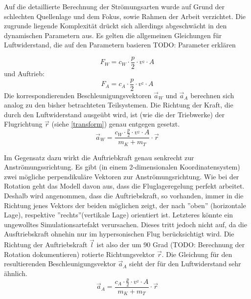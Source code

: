 Auf die detaillierte Berechnung der Strömungsarten wurde auf Grund der schlechten Quellenlage und dem Fokus, sowie Rahmen der Arbeit verzichtet. Die zugrunde liegende Komplexität drückt sich allerdings abgeschwächt in den dynamischen Parametern aus. Es gelten die allgemeinen Gleichungen für Luftwiderstand, die auf den Parametern basieren
TODO: Parameter erklären

$$F_W = c_W \cdot \frac{p}{2} \cdot v^_{2} \cdot A $$
und Auftrieb:
$$F_A = c_A \cdot \frac{p}{2} \cdot v^_{2} \cdot A $$
Die korrespondierenden Beschleunigungsvektoren $\vec a_W$ und $\vec a_A$ berechnen sich analog zu den bisher betrachteten Teilsystemen. Die Richtung der Kraft, die durch den Luftwiderstand ausgeübt wird, ist (wie die der Triebwerke) der Flugrichtung $\vec r$ (siehe \ref{transform}) genau entgegen gesetzt.
$$ \vec a_W = \frac{c_W \cdot \frac{p}{2} \cdot v^_{2} \cdot A}{m_K + m_T} \cdot \vec r $$

Im Gegensatz dazu wirkt die Auftriebkraft genau senkrecht zur Anströmungssrichtung. Es gibt (in einem 2-dimensionalen Koordinatensystem) zwei mögliche perpendikuläre Vektoren zur Anströmungsrichtung. Wie bei der Rotation geht das Modell davon aus, dass die Fluglageregelung perfekt arbeitet. Deshalb wird angenommen, dass die Auftriebskraft, so vorhanden, immer in die Richtung jenes Vektors der beiden möglichen zeigt, der nach ''oben'' (horizontale Lage), respektive ''rechts''(vertikale Lage) orientiert ist. Letzteres könnte ein ungewolltes Simulationsartefakt verursachen. Dieses tritt jedoch nicht auf, da die Ausftriebskraft ohnehin nur im hypersonischen Flug berücksichtigt wird. Die Richtung der Auftriebskraft $\vec l$ ist also der um 90 Grad (TODO: Berechnung der Rotation dokumentieren) rotierte Richtungsvektor $\vec r$. Die Gleichung für den resultierenden Beschleunigungsvektor $\vec a_A$ sieht der für den Luftwiderstand sehr ähnlich.
$$ \vec a_A = \frac{c_A \cdot \frac{p}{2} \cdot v^_{2} \cdot A}{m_K + m_T} \cdot \vec r$$